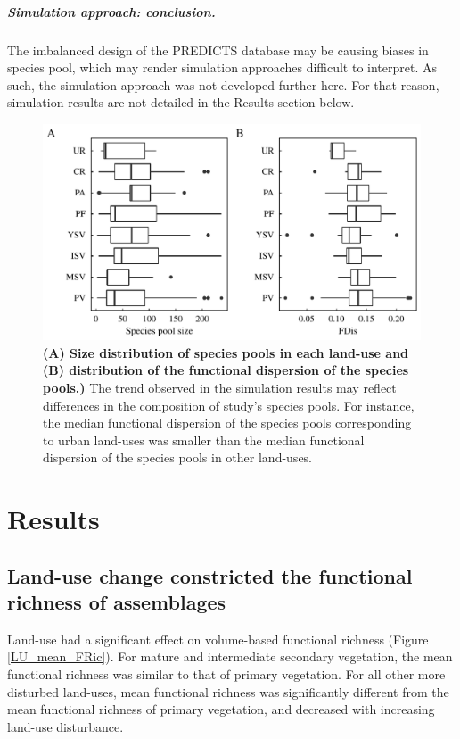 \subparagraph{Simulation approach: conclusion.} The imbalanced design of the PREDICTS database may be causing biases in species pool, which may render simulation approaches difficult to interpret. As such, the simulation approach was not developed further here. For that reason, simulation results are not detailed in the Results section below.

\begin{figure}[h!]
\centering
\includegraphics[scale=0.70]{figures/chapter3/Simulations/pool_species_FDis}
\caption[]{\textbf{(A) Size distribution of species pools in each land-use and (B) distribution of the functional dispersion of the species pools.)} The trend observed in the simulation results may reflect differences in the composition of study's species pools. For instance, the median functional dispersion of the species pools corresponding to urban land-uses was smaller than the median functional dispersion of the species pools in other land-uses.}
\label{speciespool}
\end{figure}


\pagebreak
\section{Results}

\subsection{Land-use change constricted the functional richness of assemblages}
Land-use had a significant effect on volume-based functional richness (Figure \ref{LU_mean_FRic}). For mature and intermediate secondary vegetation, the mean functional richness was similar to that of primary vegetation. For all other more disturbed land-uses, mean functional richness was significantly different from the mean functional richness of primary vegetation, and decreased with increasing land-use disturbance. 

